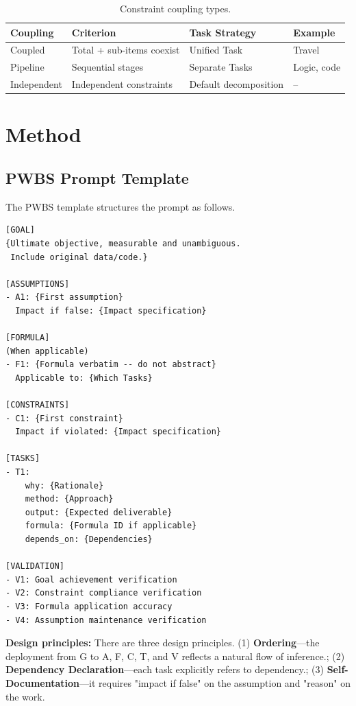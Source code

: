 \documentclass[11pt,a4paper]{article}
\begin{document}
\begin{table}[h]
\centering
\caption{Constraint coupling types.}
\label{tab:coupling}
\begin{tabular}{llll}
\toprule
\textbf{Coupling} & \textbf{Criterion} & \textbf{Task Strategy} & \textbf{Example} \\
\midrule
Coupled & Total + sub-items coexist & Unified Task & Travel \\
Pipeline & Sequential stages & Separate Tasks & Logic, code \\
Independent & Independent constraints & Default decomposition & -- \\
\bottomrule
\end{tabular}
\end{table}

\section{Method}

\subsection{PWBS Prompt Template}

The PWBS template structures the prompt as follows.

\begin{Verbatim}[frame=single,fontsize=\small]
[GOAL]
{Ultimate objective, measurable and unambiguous.
 Include original data/code.}

[ASSUMPTIONS]
- A1: {First assumption}
  Impact if false: {Impact specification}

[FORMULA]
(When applicable)
- F1: {Formula verbatim -- do not abstract}
  Applicable to: {Which Tasks}

[CONSTRAINTS]
- C1: {First constraint}
  Impact if violated: {Impact specification}

[TASKS]
- T1:
    why: {Rationale}
    method: {Approach}
    output: {Expected deliverable}
    formula: {Formula ID if applicable}
    depends_on: {Dependencies}

[VALIDATION]
- V1: Goal achievement verification
- V2: Constraint compliance verification
- V3: Formula application accuracy
- V4: Assumption maintenance verification
\end{Verbatim}

\textbf{Design principles:} There are three design principles. (1) \textbf{Ordering}---the deployment from G to A, F, C, T, and V reflects a natural flow of inference.; (2) \textbf{Dependency Declaration}---each task explicitly refers to dependency.; (3) \textbf{Self-Documentation}---it requires "impact if false" on the assumption and "reason" on the work.
\end{document}
